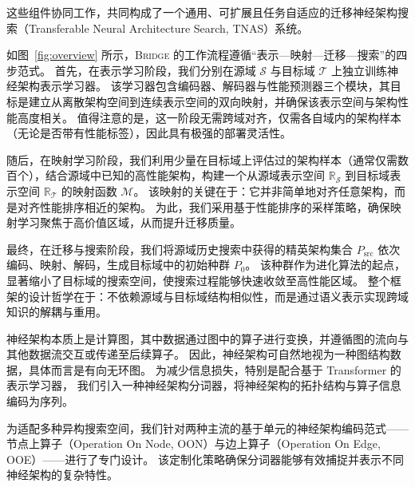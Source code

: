 \documentclass[../main.tex]{subfiles}
\begin{document}
这些组件协同工作，共同构成了一个通用、可扩展且任务自适应的迁移神经架构搜索（Transferable Neural Architecture Search, TNAS）系统。

如图~\ref{fig:overview} 所示，\textsc{Bridge} 的工作流程遵循“表示—映射—迁移—搜索”的四步范式。
首先，在表示学习阶段，我们分别在源域 $\mathcal{S}$ 与目标域 $\mathcal{T}$ 上独立训练神经架构表示学习器。
该学习器包含编码器、解码器与性能预测器三个模块，其目标是建立从离散架构空间到连续表示空间的双向映射，并确保该表示空间与架构性能高度相关。
值得注意的是，这一阶段无需跨域对齐，仅需各自域内的架构样本（无论是否带有性能标签），因此具有极强的部署灵活性。

随后，在映射学习阶段，我们利用少量在目标域上评估过的架构样本（通常仅需数百个），结合源域中已知的高性能架构，构建一个从源域表示空间 $\mathbb{R}_{\mathcal{S}}$ 到目标域表示空间 $\mathbb{R}_{\mathcal{T}}$ 的映射函数 $\mathcal{M}$。
该映射的关键在于：它并非简单地对齐任意架构，而是对齐性能排序相近的架构。
为此，我们采用基于性能排序的采样策略，确保映射学习聚焦于高价值区域，从而提升迁移质量。

最终，在迁移与搜索阶段，我们将源域历史搜索中获得的精英架构集合 $P_{\mathrm{src}}$ 依次编码、映射、解码，生成目标域中的初始种群 $P_0$。
该种群作为进化算法的起点，显著缩小了目标域的搜索空间，使搜索过程能够快速收敛至高性能区域。
整个框架的设计哲学在于：不依赖源域与目标域结构相似性，而是通过语义表示实现跨域知识的解耦与重用。

\label{sec:ch4-5-unified-encoding-and-representation-learning}

\label{sec:ch4-5-1-nas-tokenizer}

神经架构本质上是计算图，其中数据通过图中的算子进行变换，并遵循图的流向与其他数据流交互或传递至后续算子。
因此，神经架构可自然地视为一种图结构数据，具体而言是有向无环图。
为减少信息损失，特别是配合基于 Transformer 的表示学习器，
我们引入一种神经架构分词器，将神经架构的拓扑结构与算子信息编码为序列。

为适配多种异构搜索空间，我们针对两种主流的基于单元的神经架构编码范式——节点上算子（Operation On Node, OON）与边上算子（Operation On Edge, OOE）——进行了专门设计。
该定制化策略确保分词器能够有效捕捉并表示不同神经架构的复杂特性。
\end{document}
